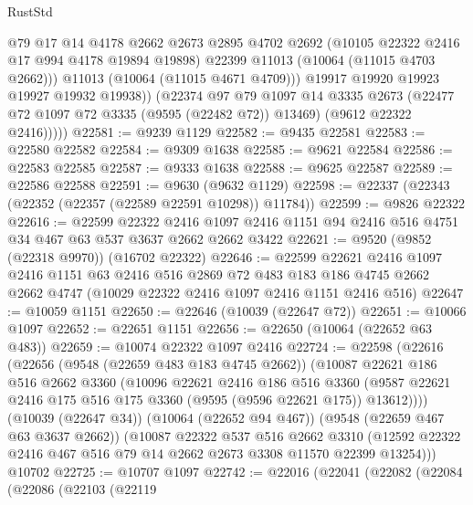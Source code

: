 \begin{lexlean}{RustStd}
\begin{coremodule}
                  @79
                  @17
                  @14
                  @4178
                  @2662
                  @2673
                  @2895
                  @4702
                  @2692
                  (@10105 @22322 @2416 @17 @994 @4178 @19894 @19898)
                  @22399
                  @11013
                  (@10064 (@11015 @4703 @2662)))
                @11013
                (@10064 (@11015 @4671 @4709)))
              @19917
              @19920
              @19923
              @19927
              @19932
              @19938))
          (@22374
            @97
            @79
            @1097
            @14
            @3335
            @2673
            (@22477 @72 @1097 @72 @3335 (@9595 (@22482 @72)) @13469)
            (@9612 @22322 @2416)))))
@22581 := @9239 @1129
@22582 := @9435 @22581
@22583 := @22580 @22582
@22584 := @9309 @1638
@22585 := @9621 @22584
@22586 := @22583 @22585
@22587 := @9333 @1638
@22588 := @9625 @22587
@22589 := @22586 @22588
@22591 := @9630 (@9632 @1129)
@22598 := @22337 (@22343 (@22352 (@22357 (@22589 @22591 @10298)) @11784))
@22599 := @9826 @22322
@22616 := @22599
    @22322
    @2416
    @1097
    @2416
    @1151
    @94
    @2416
    @516
    @4751
    @34
    @467
    @63
    @537
    @3637
    @2662
    @2662
    @3422
@22621 := @9520 (@9852 (@22318 @9970)) (@16702 @22322)
@22646 := @22599
    @22621
    @2416
    @1097
    @2416
    @1151
    @63
    @2416
    @516
    @2869
    @72
    @483
    @183
    @186
    @4745
    @2662
    @2662
    @4747
    (@10029 @22322 @2416 @1097 @2416 @1151 @2416 @516)
@22647 := @10059 @1151
@22650 := @22646 (@10039 (@22647 @72))
@22651 := @10066 @1097
@22652 := @22651 @1151
@22656 := @22650 (@10064 (@22652 @63 @483))
@22659 := @10074 @22322 @1097 @2416
@22724 := @22598
    (@22616
      (@22656
        (@9548 (@22659 @483 @183 @4745 @2662))
        (@10087
          @22621
          @186
          @516
          @2662
          @3360
          (@10096
            @22621
            @2416
            @186
            @516
            @3360
            (@9587 @22621 @2416 @175 @516 @175 @3360 (@9595 (@9596 @22621 @175)) @13612))))
      (@10039 (@22647 @34))
      (@10064 (@22652 @94 @467))
      (@9548 (@22659 @467 @63 @3637 @2662))
      (@10087
        @22322
        @537
        @516
        @2662
        @3310
        (@12592 @22322 @2416 @467 @516 @79 @14 @2662 @2673 @3308 @11570 @22399 @13254)))
    @10702
@22725 := @10707 @1097
@22742 := @22016
    (@22041
      (@22082
        (@22084
          (@22086
            (@22103
              (@22119

\end{coremodule}
\end{lexlean}
